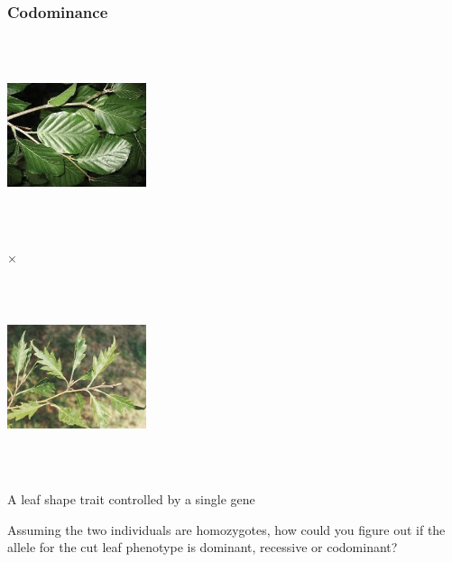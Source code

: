 \documentclass{beamer}
\begin{document}
\begin{frame}
	\frametitle{Codominance}
	
	\begin{center}
		\newcommand{\picA}{\includegraphics[keepaspectratio, height=2.25in,width=1.6in]{img/roundBeechLeaf}}
		\newcommand{\picB}{\includegraphics[keepaspectratio, height=2.25in,width=1.6in]{img/cutBeechLeaf}}
		\Huge
		\parbox{\widthof{\picA}}{\picA} $\times$ 
		\parbox{\widthof{\picB}}{\picB} 
	\end{center}	
	\normalsize
	A leaf shape trait controlled by a single gene 
	\bigskip
	
	Assuming the two individuals are homozygotes, how could you figure out if the allele for the cut leaf phenotype is dominant, recessive or codominant?
	
\end{frame}




\end{document}
